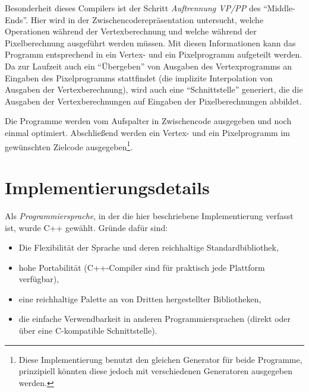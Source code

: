 \documentclass[twoside,a4paper,fleqn,12pt]{book}
\begin{document}
Besonderheit dieses Compilers ist der Schritt \emph{Auftrennung VP/PP} des "`Middle-Ends"'. Hier wird in der Zwischencoderepräsentation untersucht,
welche Operationen während der Vertexberechnung und welche während der Pixelberechnung ausgeführt werden müssen. Mit diesen Informationen kann
das Programm entsprechend in ein Vertex- und ein Pixelprogramm aufgeteilt werden. Da zur Laufzeit auch ein "`Übergeben"' von Ausgaben
des Vertexprogramms an Eingaben des Pixelprogramms stattfindet (die implizite Interpolation von Ausgaben der Vertexberechnung), wird auch eine "`Schnittstelle"' generiert,
die die Ausgaben der Vertexberechnungen auf Eingaben 
der Pixelberechnungen abbildet.

Die Programme werden vom Aufspalter in Zwischencode ausgegeben und noch einmal optimiert. %
Abschließend werden ein Vertex- und ein Pixelprogramm im gewünschten Zielcode ausgegeben\footnote{Diese Implementierung benutzt den
gleichen Generator für beide Programme, prinzipiell könnten diese jedoch mit verschiedenen Generatoren ausgegeben werden.}.

\section{Implementierungsdetails}

Als \emph{Programmiersprache}, in der die hier beschriebene Implementierung verfasst ist, wurde C++ gewählt.
Gründe dafür sind:
\begin{itemize}
\item Die Flexibilität der Sprache und deren reichhaltige Standardbibliothek,
\item hohe Portabilität (C++-Compiler sind für praktisch jede Plattform verfügbar),
\item eine reichhaltige Palette an von Dritten hergestellter Bibliotheken,
\item die einfache Verwendbarkeit in anderen Programmiersprachen (direkt oder über eine C-kompatible Schnittstelle).%
\end{itemize}
 
\end{document}
